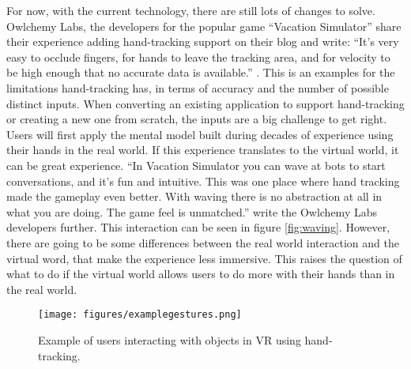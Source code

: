 For now, with the current technology, there are still lots of changes to solve. Owlchemy Labs, the developers for the popular game ``Vacation Simulator'' share their experience adding hand-tracking support on their blog and write: ``It’s very easy to occlude fingers, for hands to leave the tracking area, and for velocity to be high enough that no accurate data is available.'' \cite{VacSimBlog}. This is an examples for the limitations hand-tracking has, in terms of accuracy and the number of possible distinct inputs. When converting an existing application to support hand-tracking or creating a new one from scratch, the inputs are a big challenge to get right. Users will first apply the mental model built during decades of experience using their hands in the real world. If this experience translates to the virtual world, it can be great experience. ``In Vacation Simulator you can wave at bots to start conversations, and it’s fun and intuitive. This was one place where hand tracking made the gameplay even better. With waving there is no abstraction at all in what you are doing. The game feel is unmatched.'' write the Owlchemy Labs developers further. This interaction can be seen in figure \ref{fig:waving}. However, there are going to be some differences between the real world interaction and the virtual word, that make the experience less immersive. This raises the question of what to do if the virtual world allows users to do more with their hands than in the real world. 


\begin{figure}[!h]
    \centering
    \texttt{[image: figures/examplegestures.png]}
    \caption{Example of users interacting with objects in VR using hand-tracking. \cite{Han}}
    \label{fig:example}
\end{figure}

